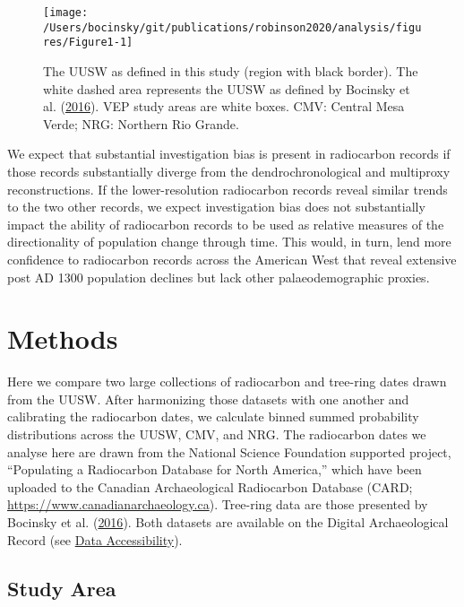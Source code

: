 \documentclass[
]{sa}
\begin{document}
\begin{figure}

{\centering \texttt{[image: /Users/bocinsky/git/publications/robinson2020/analysis/figures/Figure1-1]} 

}

\caption{The UUSW as defined in this study (region with black border). The white dashed area represents the UUSW as defined by Bocinsky et al. (\protect\hyperlink{ref-Bocinsky2016}{2016}). VEP study areas are white boxes. CMV: Central Mesa Verde; NRG: Northern Rio Grande.}\label{fig:Figure1}
\end{figure}

We expect that substantial investigation bias is present in radiocarbon records if those records substantially diverge from the dendrochronological and multiproxy reconstructions. If the lower-resolution radiocarbon records reveal similar trends to the two other records, we expect investigation bias does not substantially impact the ability of radiocarbon records to be used as relative measures of the directionality of population change through time. This would, in turn, lend more confidence to radiocarbon records across the American West that reveal extensive post AD 1300 population declines but lack other palaeodemographic proxies.

\hypertarget{methods}{%
\section*{Methods}\label{methods}}

Here we compare two large collections of radiocarbon and tree-ring dates drawn from the UUSW. After harmonizing those datasets with one another and calibrating the radiocarbon dates, we calculate binned summed probability distributions across the UUSW, CMV, and NRG. The radiocarbon dates we analyse here are drawn from the National Science Foundation supported project, ``Populating a Radiocarbon Database for North America,'' which have been uploaded to the Canadian Archaeological Radiocarbon Database (CARD; \url{https://www.canadianarchaeology.ca}). Tree-ring data are those presented by Bocinsky et al. (\protect\hyperlink{ref-Bocinsky2016}{2016}). Both datasets are available on the Digital Archaeological Record (see \protect\hyperlink{data-accessibility}{Data Accessibility}).

\hypertarget{study-area}{%
\subsection*{Study Area}\label{study-area}}
\end{document}
